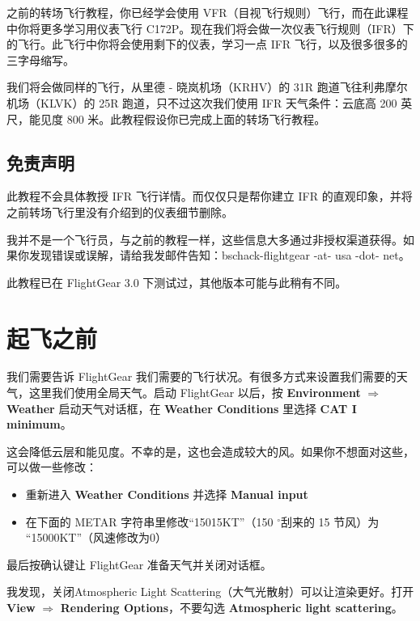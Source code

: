 之前的转场飞行教程，你已经学会使用 VFR（目视飞行规则）飞行，而在此课程中你将更多学习用仪表飞行 C172P。现在我们将会做一次仪表飞行规则（IFR）下的飞行。此飞行中你将会使用剩下的仪表，学习一点 IFR 飞行，以及很多很多的三字母缩写。

我们将会做同样的飞行，从里德 - 晓岚机场（KRHV）的 31R 跑道飞往利弗摩尔机场（KLVK）的 25R 跑道，只不过这次我们使用 IFR 天气条件：云底高 200 英尺，能见度 800 米。此教程假设你已完成上面的转场飞行教程。

\subsection{免责声明}

此教程不会具体教授 IFR 飞行详情。而仅仅只是帮你建立 IFR 的直观印象，并将之前转场飞行里没有介绍到的仪表细节删除。

我并不是一个飞行员，与之前的教程一样，这些信息大多通过非授权渠道获得。如果你发现错误或误解，请给我发邮件告知：bschack-flightgear -at- usa -dot- net。

此教程已在 FlightGear 3.0 下测试过，其他版本可能与此稍有不同。

\section{起飞之前}

我们需要告诉 FlightGear 我们需要的飞行状况。有很多方式来设置我们需要的天气，这里我们使用全局天气。启动 FlightGear 以后，按 \textbf{\textsf{Environment}} $\Rightarrow$ \textbf{\textsf{Weather}} 启动天气对话框，在 \textbf{\textsf{Weather Conditions}} 里选择 \textbf{\textsf{CAT I minimum}}。

这会降低云层和能见度。不幸的是，这也会造成较大的风。如果你不想面对这些，可以做一些修改：

\begin{itemize}
\item 重新进入 \textbf{\textsf{Weather Conditions}} 并选择
  \textbf{\textsf{Manual input}}
\item 在下面的 METAR 字符串里修改``15015KT''（150 $^\circ$刮来的 15 节风）为 ``15000KT''（风速修改为0）
\end{itemize}

最后按确认键让 FlightGear 准备天气并关闭对话框。

我发现，关闭Atmospheric Light Scattering（大气光散射）可以让渲染更好。打开 \textbf{\textsf{View}} $\Rightarrow$ \textbf{\textsf{Rendering Options}}，不要勾选 \textbf{\textsf{Atmospheric light scattering}}。

